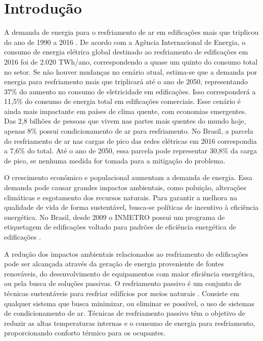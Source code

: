 \documentclass[brazil,hardcopy,openany,a5paper]{ufscthesis}
\begin{document}
	
	\frontmatter
	\folhaderosto[]%
	
	\mainmatter

	\chapter{Introdução}
	\label{chapter:introducao}
	
	A demanda de energia para o resfriamento de ar em edificações mais que triplicou do ano de 1990 a 2016 \cite{IEA2018}. De acordo com a Agência Internacional de Energia, o consumo de energia elétrica global destinado ao resfriamento de edificações em 2016 foi de 2.020 TWh/ano, correspondendo a quase um quinto do consumo total no setor. Se não houver mudanças no cenário atual, estima-se que a demanda por energia para resfriamento mais que triplicará até o ano de 2050, representando 37\% do aumento no consumo de eletricidade em edificações. Isso corresponderá a 11,5\% do consumo de energia total em edificações comerciais. Esse cenário é ainda mais impactante em países de clima quente, com economias emergentes. Das 2,8 bilhões de pessoas que vivem nas partes mais quentes do mundo hoje, apenas 8\% possui condicionamento de ar para resfriamento. No Brasil, a parcela do resfriamento de ar nas cargas de pico das redes elétricas em 2016 correspondia a 7,6\% do total. Até o ano de 2050, essa parcela pode representar 30,8\% da carga de pico, se nenhuma medida for tomada para a mitigação do problema.
	
	O crescimento econômico e populacional aumentam a demanda de energia. Essa demanda pode causar grandes impactos ambientais, como poluição, alterações climáticas e esgotamento dos recursos naturais. Para garantir a melhora na qualidade de vida de forma sustentável, busca-se políticas de incentivo à eficiência energética. No Brasil, desde 2009 o INMETRO possui um programa de etiquetagem de edificações voltado para padrões de eficiência energética de edificações \cite{BRASIL2009}.
	
	A redução dos impactos ambientais relacionados ao resfriamento de edificações pode ser alcançada através da geração de energia proveniente de fontes renováveis, do desenvolvimento de equipamentos com maior eficiência energética, ou pela busca de soluções passivas. O resfriamento passivo é um conjunto de técnicas sustentáveis para resfriar edifícios por meios naturais \cite{Samani2016}. Consiste em qualquer sistema que busca minimizar, ou eliminar se possível, o uso de sistemas de condicionamento de ar. Técnicas de resfriamento passivo têm o objetivo de reduzir as altas temperaturas internas e o consumo de energia para resfriamento, proporcionando conforto térmico para os ocupantes.
	
\end{document}
